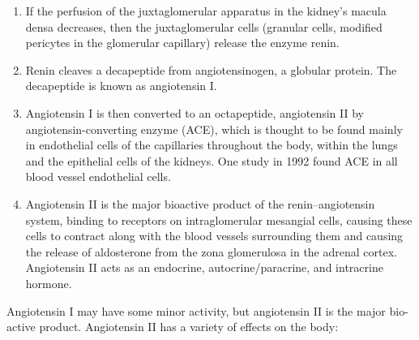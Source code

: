 \begin{enumerate}
\def\labelenumi{\arabic{enumi}.}
\tightlist
\item
  If the perfusion of the juxtaglomerular apparatus in the kidney's macula densa decreases, then the juxtaglomerular cells (granular cells, modified pericytes in the glomerular capillary) release the enzyme renin.
\item
  Renin cleaves a decapeptide from angiotensinogen, a globular protein. The decapeptide is known as angiotensin I.
\item
  Angiotensin I is then converted to an octapeptide, angiotensin II by angiotensin-converting enzyme (ACE), which is thought to be found mainly in endothelial cells of the capillaries throughout the body, within the lungs and the epithelial cells of the kidneys. One study in 1992 found ACE in all blood vessel endothelial cells.
\item
  Angiotensin II is the major bioactive product of the renin--angiotensin system, binding to receptors on intraglomerular mesangial cells, causing these cells to contract along with the blood vessels surrounding them and causing the release of aldosterone from the zona glomerulosa in the adrenal cortex. Angiotensin II acts as an endocrine, autocrine/paracrine, and intracrine hormone.
\end{enumerate}

Angiotensin I may have some minor activity, but angiotensin II is the major bio-active product. Angiotensin II has a variety of effects on the body:

